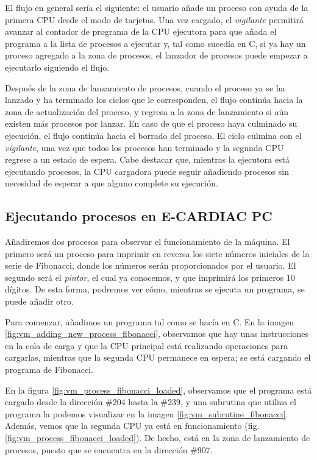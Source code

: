 \documentclass[letterpaper,12pt,oneside]{book}
\begin{document}
			
				El flujo en general sería el siguiente: el usuario añade un proceso con ayuda de la primera CPU
				desde el modo de tarjetas. Una vez cargado,
				el \textit{vigilante} permitirá avanzar al contador de programa de la CPU ejecutora
				 para que añada el programa a la lista
				de procesos a ejecutar y, tal como sucedía en C, si ya hay un proceso agregado a la zona de procesos, el lanzador de procesos
				puede empezar a ejecutarlo siguiendo el flujo. 
				
				Después de la zona de lanzamiento de procesos, cuando el proceso ya se ha lanzado y ha terminado los ciclos que le corresponden,
				el flujo continúa  hacia la zona de actualización del proceso, y regresa a 
				la zona de lanzamiento si aún existen más procesos por lanzar. En caso de que
				el proceso haya culminado su ejecución, el flujo continúa hacia el borrado del proceso. 
				El ciclo culmina con el \textit{vigilante}, una vez que 
				todos los procesos 
				han terminado 
				y la segunda CPU regrese a un estado de espera. Cabe destacar que, mientras la ejecutora está ejecutando procesos, la CPU cargadora
				puede seguir añadiendo procesos sin necesidad de esperar a que alguno complete su ejecución.

			\clearpage	
			
		\subsection{Ejecutando procesos en E-CARDIAC PC}		
			
			Añadiremos dos procesos para observar el funcionamiento de la máquina. El primero será un proceso para imprimir en reversa los 
			siete números iniciales de la serie de Fibonacci, donde los números serán proporcionados por el usuario.
			 El segundo será el
			\textit{pintor}, el cual ya conocemos, y que imprimirá los primeros 10 dígitos. De esta forma, podremos ver cómo,
			mientras se ejecuta un programa, se puede añadir otro.
		
			
			Para comenzar, añadimos un programa tal como se hacía en C. En la imagen \ref{fig:vm_adding_new_process_fibonacci},
			observamos que hay unas instrucciones 
			en la cola de carga y que la CPU principal está realizando operaciones para
			cargarlas, mientras que la segunda CPU
			permanece en espera; se está cargando el programa de Fibonacci. 
			
			En la figura \ref{fig:vm_process_fibonacci_loaded}, observamos que el programa está cargado desde la dirección \#204 hasta la \#239,
			y una subrutina que utiliza el programa la podemos visualizar en la imagen \ref{fig:vm_subrutine_fibonacci}. Además,
			vemos que la segunda CPU ya está en funcionamiento (fig. \ref{fig:vm_process_fibonacci_loaded}). 
			De hecho, está en la zona de lanzamiento de procesos, puesto que se encuentra
			en la dirección \#907.
			
\end{document}
